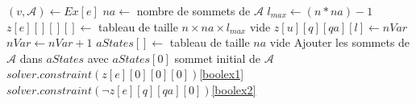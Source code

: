 \documentclass[12pt,a4paper,oneside,titlepage]{report}
\begin{document}
\begin{algorithm}[H]
\begin{algorithmic}[1]
		\State $(v,\mathcal{A})\gets Ex[e]$
		\State $na\gets$ nombre de sommets de $\mathcal{A}$
		\State $l_{max}\gets (n*na)-1$
		\State $z[e][][][]\gets$ tableau de taille $n\times na\times l_{max}$ vide
					\State $z[u][q][qa][l]\gets nVar$
					\State $nVar\gets nVar+1$
				\EndFor
			\EndFor
		\EndFor
		\State $aStates[]\gets$ tableau de taille $na$ vide
		\State Ajouter les sommets de $\mathcal{A}$ dans $aStates$ avec $aStates[0]$ sommet initial de $\mathcal{A}$
		\State $solver.constraint(z[e][0][0][0])$\Comment\ref{boolex1}
					\State $solver.constraint(\neg z[e][q][qa][0])$\Comment\ref{boolex2}
				\EndIf
			\EndFor
		\EndFor
{}
\end{algorithmic}
\end{algorithm}
\end{document}
